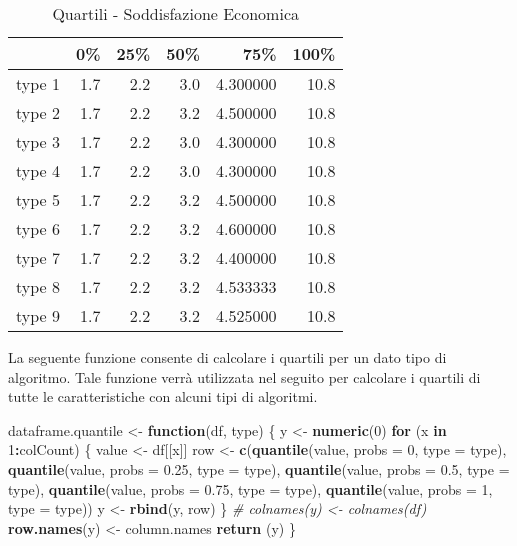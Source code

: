 \documentclass[]{book}
\newenvironment{Shaded}{\begin{snugshade}}{\end{snugshade}}
\newcommand{\KeywordTok}[1]{\textcolor[rgb]{0.13,0.29,0.53}{\textbf{#1}}}
\newcommand{\DataTypeTok}[1]{\textcolor[rgb]{0.13,0.29,0.53}{#1}}
\newcommand{\DecValTok}[1]{\textcolor[rgb]{0.00,0.00,0.81}{#1}}
\newcommand{\FloatTok}[1]{\textcolor[rgb]{0.00,0.00,0.81}{#1}}
\newcommand{\StringTok}[1]{\textcolor[rgb]{0.31,0.60,0.02}{#1}}
\newcommand{\CommentTok}[1]{\textcolor[rgb]{0.56,0.35,0.01}{\textit{#1}}}
\newcommand{\ControlFlowTok}[1]{\textcolor[rgb]{0.13,0.29,0.53}{\textbf{#1}}}
\newcommand{\OperatorTok}[1]{\textcolor[rgb]{0.81,0.36,0.00}{\textbf{#1}}}
\newcommand{\NormalTok}[1]{#1}
\begin{document}
\begin{table}

\caption{\label{tab:quantili}Quartili - Soddisfazione Economica}
\centering
\begin{tabular}[t]{l|r|r|r|r|r}
\hline
  & 0\% & 25\% & 50\% & 75\% & 100\%\\
\hline
type 1 & 1.7 & 2.2 & 3.0 & 4.300000 & 10.8\\
\hline
type 2 & 1.7 & 2.2 & 3.2 & 4.500000 & 10.8\\
\hline
type 3 & 1.7 & 2.2 & 3.0 & 4.300000 & 10.8\\
\hline
type 4 & 1.7 & 2.2 & 3.0 & 4.300000 & 10.8\\
\hline
type 5 & 1.7 & 2.2 & 3.2 & 4.500000 & 10.8\\
\hline
type 6 & 1.7 & 2.2 & 3.2 & 4.600000 & 10.8\\
\hline
type 7 & 1.7 & 2.2 & 3.2 & 4.400000 & 10.8\\
\hline
type 8 & 1.7 & 2.2 & 3.2 & 4.533333 & 10.8\\
\hline
type 9 & 1.7 & 2.2 & 3.2 & 4.525000 & 10.8\\
\hline
\end{tabular}
\end{table}

La seguente funzione consente di calcolare i quartili per un dato tipo
di algoritmo. Tale funzione verrà utilizzata nel seguito per calcolare i
quartili di tutte le caratteristiche con alcuni tipi di algoritmi.

\begin{Shaded}
\begin{Highlighting}[]
\NormalTok{dataframe.quantile <-}\StringTok{ }\ControlFlowTok{function}\NormalTok{(df, type) \{}
\NormalTok{  y <-}\StringTok{ }\KeywordTok{numeric}\NormalTok{(}\DecValTok{0}\NormalTok{)}
  \ControlFlowTok{for}\NormalTok{ (x }\ControlFlowTok{in} \DecValTok{1}\OperatorTok{:}\NormalTok{colCount) \{}
\NormalTok{    value <-}\StringTok{ }\NormalTok{df[[x]]}
\NormalTok{    row <-}\StringTok{ }\KeywordTok{c}\NormalTok{(}\KeywordTok{quantile}\NormalTok{(value, }\DataTypeTok{probs =} \DecValTok{0}\NormalTok{, }\DataTypeTok{type =}\NormalTok{ type),}
             \KeywordTok{quantile}\NormalTok{(value, }\DataTypeTok{probs =} \FloatTok{0.25}\NormalTok{, }\DataTypeTok{type =}\NormalTok{ type),}
             \KeywordTok{quantile}\NormalTok{(value, }\DataTypeTok{probs =} \FloatTok{0.5}\NormalTok{, }\DataTypeTok{type =}\NormalTok{ type),}
             \KeywordTok{quantile}\NormalTok{(value, }\DataTypeTok{probs =} \FloatTok{0.75}\NormalTok{, }\DataTypeTok{type =}\NormalTok{ type),}
             \KeywordTok{quantile}\NormalTok{(value, }\DataTypeTok{probs =} \DecValTok{1}\NormalTok{, }\DataTypeTok{type =}\NormalTok{ type))}
\NormalTok{    y <-}\StringTok{ }\KeywordTok{rbind}\NormalTok{(y, row)}
\NormalTok{  \}}
  \CommentTok{# colnames(y) <- colnames(df)}
  \KeywordTok{row.names}\NormalTok{(y) <-}\StringTok{ }\NormalTok{column.names}
  \KeywordTok{return}\NormalTok{ (y)}
\NormalTok{\}}
\end{Highlighting}
\end{Shaded}
\end{document}
